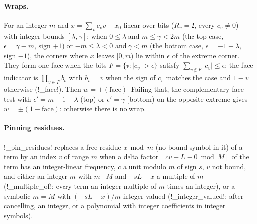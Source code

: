 \paragraph{Wraps.} For an integer $m$ and $x=\sum_vc_vv+x_0$ linear over bits ($R_v=2$, every $c_v\ne0$) with integer bounds $[\lambda,\gamma]$: when $0\le\lambda$ and $m\le\gamma<2m$ (the top case, $\epsilon=\gamma-m$, sign $+1$) or $-m\le\lambda<0$ and $\gamma<m$ (the bottom case, $\epsilon=-1-\lambda$, sign $-1$), the corners where $x$ leaves $[0,m)$ lie within $\epsilon$ of the extreme corner. They form one face when the bits $F=\{v:|c_v|>\epsilon\}$ satisfy $\sum_{v\notin F}|c_v|\le\epsilon$; the face indicator is $\prod_{v\in F}b_v$ with $b_v=v$ when the sign of $c_v$ matches the case and $1-v$ otherwise (\py!_face!). Then $w=\pm(\text{face})$. Failing that, the complementary face test with $\epsilon'=m-1-\lambda$ (top) or $\epsilon'=\gamma$ (bottom) on the opposite extreme gives $w=\pm(1-\text{face})$; otherwise there is no wrap.

\paragraph{Pinning residues.} \py!_pin_residues! replaces a free residue $x\bmod m$ (no bound symbol in it) of a term by an index $v$ of range $m$ when a delta factor $[cv+L\equiv0\bmod M]$ of the term has an integer-linear frequency, $c$ a unit modulo $m$ of sign $s$, $v$ not bound, and either an integer $m$ with $m\mid M$ and $-sL-x$ a multiple of $m$ (\py!_multiple_of!: every term an integer multiple of $m$ times an integer), or a symbolic $m=M$ with $(-sL-x)/m$ integer-valued (\py!_integer_valued!: after cancelling, an integer, or a polynomial with integer coefficients in integer symbols).


